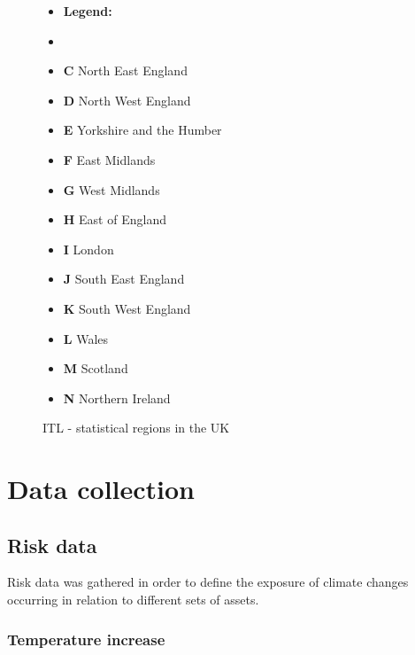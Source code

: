 \documentclass[10pt,a4]{article}
\begin{document}
\begin{figure}[h]
  \centering
  \begin{minipage}{.5\textwidth}
      \centering
      \resizebox{0.8\textwidth}{!}{}
      \caption{ITL - statistical regions in the UK \cite{zotero-176}}
      \label{dg:ITL Uk}
  \end{minipage}%
  \begin{minipage}{.5\textwidth}
    \vspace{-2cm}
    \begin{itemize}
            \item[] \hspace{-.5cm}\textbf{Legend:}
            \item[]
            \item \textbf{C} North East England
            \item \textbf{D} North West England
            \item \textbf{E} Yorkshire and the Humber
            \item \textbf{F} East Midlands
            \item \textbf{G} West Midlands
            \item \textbf{H} East of England
            \item \textbf{I} London
            \item \textbf{J} South East England
            \item \textbf{K} South West England
            \item \textbf{L} Wales
            \item \textbf{M} Scotland
            \item \textbf{N} Northern Ireland
        \end{itemize}
    \end{minipage}
\end{figure}

\section{Data collection}

\subsection{Risk data}
Risk data was gathered in order to define the exposure of climate changes occurring in relation to different sets of assets. 
\subsubsection{Temperature increase}
\end{document}
